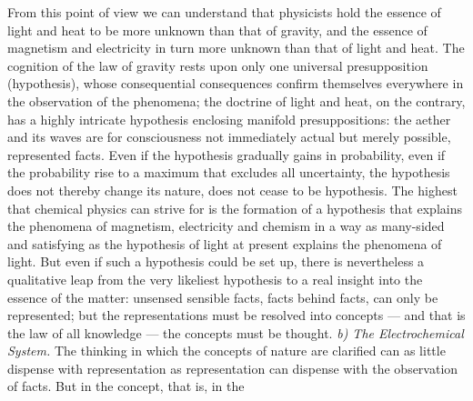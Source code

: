 \documentclass[12pt,a4paper]{book}
\newcommand{\runin}[1]{\emph{#1}\hspace{0.4em}}
\begin{document}
From this point of view we can understand that physicists hold the essence of light and heat to be more unknown than that
of gravity, and the essence of magnetism and electricity in turn more unknown than that of light and heat. The cognition
of the law of gravity rests upon only one universal presupposition (hypothesis), whose consequential consequences confirm
themselves everywhere in the observation of the phenomena; the doctrine of light and heat, on the contrary, has a highly
intricate hypothesis enclosing manifold presuppositions: the aether and its waves are for consciousness not immediately
actual but merely possible, represented facts. Even if the hypothesis gradually gains in probability, even if the
probability rise to a maximum that excludes all uncertainty, the hypothesis does not thereby change its nature, does not
cease to be hypothesis. The highest that chemical physics can strive for is the formation of a hypothesis that explains
the phenomena of magnetism, electricity and chemism in a way as many-sided and satisfying as the hypothesis of light at
present explains the phenomena of light. But even if such a hypothesis could be set up, there is nevertheless a
qualitative leap from the very likeliest hypothesis to a real insight into the essence of the matter: unsensed sensible
facts, facts behind facts, can only be represented; but the representations must be resolved into concepts --- and that
is the law of all knowledge --- the concepts must be thought.
\runin{b) The Electrochemical System.} The thinking in which the concepts of nature are clarified can as little dispense
with representation as representation can dispense with the observation of facts. But in the concept, that is, in the
\end{document}
